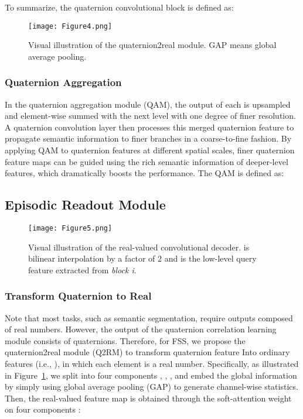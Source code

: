 \documentclass[lettersize,journal]{IEEEtran}
\begin{document}
To summarize, the quaternion convolutional block is defined as:


\begin{figure}[t]
\texttt{[image: Figure4.png]}
\caption{ Visual illustration of the quaternion2real module. GAP means global average pooling. 
\label{Figure4}}
\end{figure}  

\subsubsection{Quaternion Aggregation}
In the quaternion aggregation module (QAM), the output of each  is upsampled and element-wise summed with the next level  with one degree of finer resolution. A quaternion convolution layer then processes this merged quaternion feature to propagate semantic information to finer branches in a coarse-to-fine fashion. By applying QAM to quaternion features at different spatial scales, finer quaternion feature maps can be guided using the rich semantic information of deeper-level features, which dramatically boosts the performance. The QAM is defined as:


\subsection{Episodic Readout Module}\label{4.7}

\begin{figure}[t]
\texttt{[image: Figure5.png]}
\caption{Visual illustration of the real-valued convolutional decoder.  is bilinear interpolation by a factor of 2 and  is the low-level query feature extracted from \textit{block i}. 
\label{Figure5}}
\end{figure} 

\subsubsection{Transform Quaternion to Real}
Note that most tasks, such as semantic segmentation, require outputs composed of real numbers. However, the output of the quaternion correlation learning module  consists of quaternions. Therefore, for FSS, we propose the quaternion2real module (Q2RM) to transform quaternion feature  Into ordinary features (i.e., ), in which each element is a real number. Specifically, as illustrated in Figure~\ref{Figure4}, we split  into four components , , ,  and embed the global information by simply using global average pooling (GAP) to generate channel-wise statistics. Then, the real-valued feature map  is obtained through the soft-attention weight  on four components :
\end{document}
